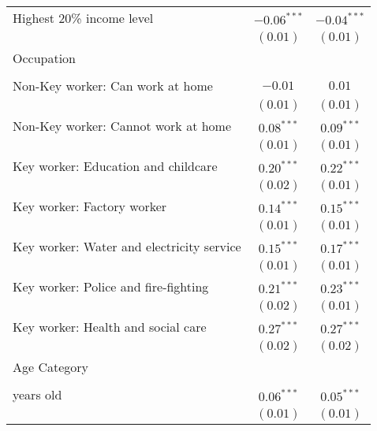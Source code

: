 \begin{table}
\begin{center}
\begin{scriptsize}
\begin{tabular}{l c c}
\quad Highest 20\% income level                 & $-0.06^{***}$ & $-0.04^{***}$ \\
                                                & $(0.01)$      & $(0.01)$      \\
Occupation                                      &               &               \\
                                                &               &               \\
\quad Non-Key worker: Can work at home          & $-0.01$       & $0.01$        \\
                                                & $(0.01)$      & $(0.01)$      \\
\quad Non-Key worker: Cannot work at home       & $0.08^{***}$  & $0.09^{***}$  \\
                                                & $(0.01)$      & $(0.01)$      \\
\quad Key worker: Education and childcare       & $0.20^{***}$  & $0.22^{***}$  \\
                                                & $(0.02)$      & $(0.01)$      \\
\quad Key worker: Factory worker                & $0.14^{***}$  & $0.15^{***}$  \\
                                                & $(0.01)$      & $(0.01)$      \\
\quad Key worker: Water and electricity service & $0.15^{***}$  & $0.17^{***}$  \\
                                                & $(0.01)$      & $(0.01)$      \\
\quad Key worker: Police and fire-fighting      & $0.21^{***}$  & $0.23^{***}$  \\
                                                & $(0.02)$      & $(0.01)$      \\
\quad Key worker: Health and social care        & $0.27^{***}$  & $0.27^{***}$  \\
                                                & $(0.02)$      & $(0.02)$      \\
Age Category                                    &               &               \\
                                                &               &               \\
\quad 40 years old                              & $0.06^{***}$  & $0.05^{***}$  \\
                                                & $(0.01)$      & $(0.01)$      \\

\end{tabular}
\end{scriptsize}
\end{center}
\end{table}

